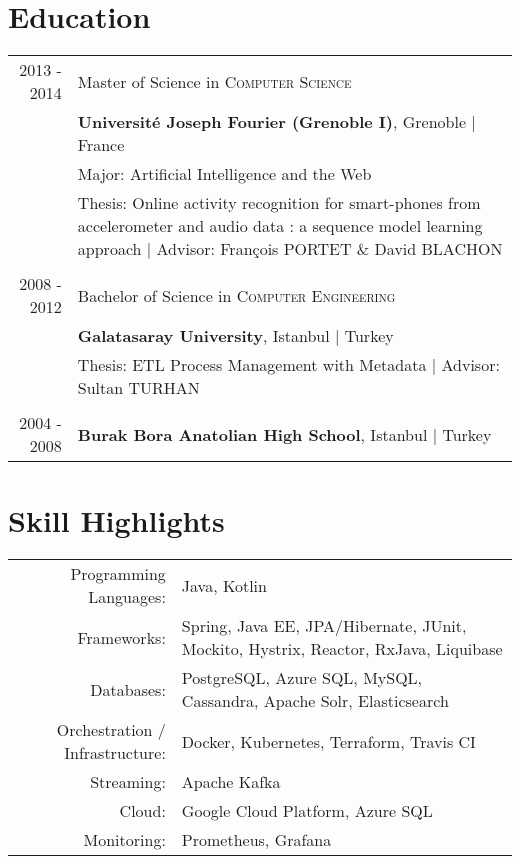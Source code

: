 \documentclass[a4paper,10pt]{article} %
\begin{document}

\section{Education}

\begin{tabular}{r|p{14cm}}

\textsc{2013 - 2014} & Master of Science in \textsc{}\textsc{Computer Science} \\& \normalsize\textbf{Université Joseph Fourier (Grenoble I)}, Grenoble | France\\
&  Major: Artificial Intelligence and the Web\\
& Thesis: Online activity recognition for smart-phones from accelerometer and audio data : a sequence model learning approach | \small Advisor: François \textsc{PORTET} \& David \textsc{BLACHON}  \\
&\\


\textsc{2008 - 2012} & Bachelor of Science in \textsc{}\textsc{Computer Engineering} \\& \normalsize\textbf{Galatasaray University}, Istanbul | Turkey\\
& Thesis: ETL Process Management with Metadata | \small Advisor: Sultan \textsc{TURHAN}\\
&\\


\textsc{2004 - 2008}& \textbf{Burak Bora Anatolian High School}, Istanbul | Turkey
\end{tabular}


\section{Skill Highlights}

\begin{tabular}{r|p{13cm}}
Programming Languages: & Java, Kotlin \\
Frameworks:  & Spring, Java EE, JPA/Hibernate, JUnit, Mockito, Hystrix, Reactor, RxJava, Liquibase \\
Databases: & PostgreSQL, Azure SQL, MySQL, Cassandra, Apache Solr, Elasticsearch \\
Orchestration / Infrastructure: & Docker, Kubernetes, Terraform, Travis CI \\
Streaming: & Apache Kafka \\
Cloud: & Google Cloud Platform, Azure SQL \\
Monitoring: & Prometheus, Grafana \\

\end{tabular}
\end{document}
